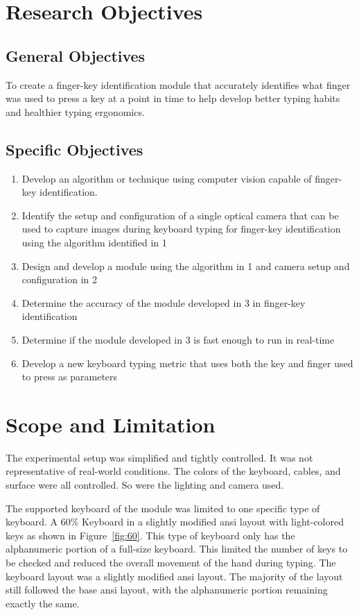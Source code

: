 \documentclass{report}
\begin{document}
\section{Research Objectives}

\subsection{General Objectives}
To create a finger-key identification module that accurately identifies what
finger was used to press a key at a point in time to help develop better typing
habits and healthier typing ergonomics.

\subsection{Specific Objectives}
\begin{enumerate}
	\item Develop an algorithm or technique using computer vision capable of
	      finger-key identification.
	\item Identify the setup and configuration of a single optical camera that can
	      be used to capture images during keyboard typing for finger-key
	      identification using the algorithm identified in 1
	\item Design and develop a module using the algorithm in 1 and camera setup
	      and configuration in 2
	\item Determine the accuracy of the module developed in 3 in finger-key
	      identification
	\item Determine if the module developed in 3 is fast enough to run in
	      real-time
	\item Develop a new keyboard typing metric that uses both the key and
	      finger used to press as parameters
\end{enumerate}

\section{Scope and Limitation}
The experimental setup was simplified and tightly controlled. It was not
representative of real-world conditions. The colors of the keyboard, cables, and
surface were all controlled. So were the lighting and camera used.

The supported keyboard of the module was limited to one specific type of
keyboard. A 60\% Keyboard in a slightly modified \ac{ansi} layout with
light-colored keys as shown in Figure~\ref{fig:60}. This type of keyboard only
has the alphanumeric portion of a full-size keyboard. This limited the number of
keys to be checked and reduced the overall movement of the hand during typing.
The keyboard layout was a slightly modified \ac{ansi} layout. The majority of
the layout still followed the base \ac{ansi} layout, with the alphanumeric
portion remaining exactly the same.
\end{document}
